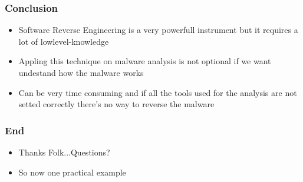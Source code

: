 \documentclass[]{beamer}
\begin{document}
	 	\begin{frame}
			\frametitle{Conclusion}
			\begin{itemize}
				\item{Software Reverse Engineering is a very powerfull instrument but it requires a lot of lowlevel-knowledge }
				\item{Appling this technique on malware analysis is not optional if we want undestand how the malware works}
				\item{Can be very time consuming and if all the tools used for the analysis are not setted correctly there's no way to reverse the malware }
			\end{itemize}
		\end{frame}
		\begin{frame}
			\frametitle{End}
			\begin{itemize}
				\item{Thanks Folk...Questions?}
				\item{So now one practical example}
			\end{itemize}
		\end{frame}




\end{document}
